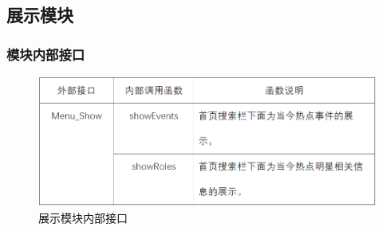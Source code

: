 \subsection{展示模块}
\subsubsection{模块内部接口}
\begin{figure}[!htbp]
	\centering
	\includegraphics[scale=0.75]{image/b7.png} %
	\caption{展示模块内部接口} %
\end{figure}
